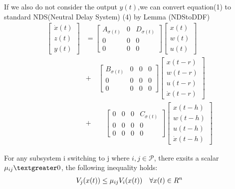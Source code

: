 \documentclass[twocolumn]{autart}    %
\begin{document}
If we also do not consider the output $y(t)$,we can convert equation(1) to standard NDS(Neutral Delay System) (4) by Lemma (NDStoDDF)
\begin{equation}
    \begin{aligned}
        \begin{bmatrix}
            \dot{x}(t) \\
            z(t) \\
            y(t) 
        \end{bmatrix} &=\begin{bmatrix}
            A_{\sigma(t)} & 0 & D_{\sigma(t)}\\
            0 & 0 & 0\\
            0 & 0 & 0
        \end{bmatrix}\begin{bmatrix}
            x(t) \\
            w(t) \\
            u(t) 
        \end{bmatrix} \\ 
        &+ \quad \begin{bmatrix}
            B_{\sigma(t)} & 0 & 0 & 0\\
            0 & 0 & 0 & 0\\
            0 & 0 & 0 & 0
        \end{bmatrix} \begin{bmatrix}
            x(t-r) \\
            w(t-r) \\
            u(t-r) \\
            \dot{x}(t-r)
        \end{bmatrix} \\
        &+ \qquad \begin{bmatrix}
            0 & 0 & 0 & C_{\sigma(t)}\\
            0 & 0 & 0 & 0\\
            0 & 0 & 0 & 0
        \end{bmatrix} \begin{bmatrix}
            x(t-h) \\
            w(t-h) \\
            u(t-h) \\
            \dot{x}(t-h)
        \end{bmatrix}
    \end{aligned}
\end{equation}

\begin{assum}
    For any subsystem i switching to j where $i,j \in \mathcal{P}$, there exsits a scalar $\mu_{ij} \textgreater 0$, the following inequality holds:
    \begin{equation}
            \begin{aligned}
                \setlength{\arraycolsep}{0.9pt}
                V_{j}(x(t)) \le \mu_{ij}V_{i}(x(t)) \quad \forall x(t) \in R^{n}
            \end{aligned}
        \end{equation}
    \end{assum}
\end{document}
